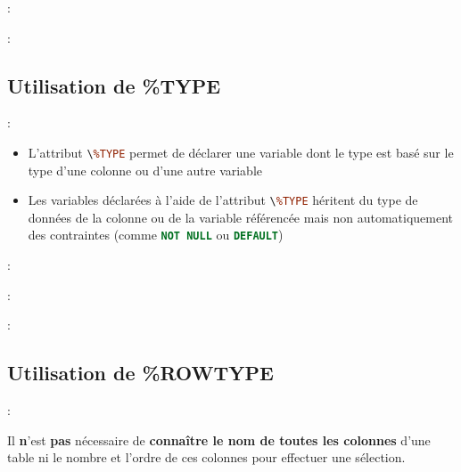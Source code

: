 \documentclass[10pt]{beamer}
\begin{document}
\begin{frame}{\secname : \subsecname}
    
\end{frame}

\begin{frame}{\secname : \subsecname}
    
\end{frame}

\subsection{Utilisation de \%TYPE}
\begin{frame}{\secname : \subsecname}
    \begin{itemize}
        \item L'attribut \lstinline[language=sql]!\%TYPE! permet de déclarer une variable dont le type est basé sur le type d'une colonne ou d'une autre variable
        \item Les variables déclarées à l'aide de l'attribut \lstinline[language=sql]!\%TYPE! héritent du type de données de la colonne ou de la variable référencée mais non automatiquement des contraintes (comme \lstinline[language=sql]!NOT NULL! ou \lstinline[language=sql]!DEFAULT!)
    \end{itemize}
\end{frame}

\begin{frame}{\secname : \subsecname}
    
\end{frame}

\begin{frame}{\secname : \subsecname}
    
\end{frame}

\begin{frame}{\secname : \subsecname}
    
\end{frame}

\subsection{Utilisation de \%ROWTYPE}
\begin{frame}{\secname : \subsecname}
    
    Il \textbf{n}'est \textbf{pas} nécessaire de \textbf{connaître le nom de toutes les colonnes} d'une table ni le nombre et l'ordre de ces colonnes pour effectuer une sélection.
\end{frame}
\end{document}
